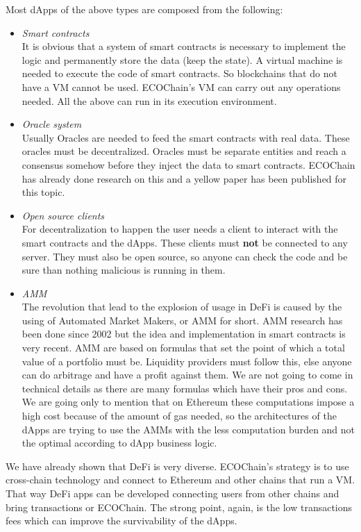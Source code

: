\documentclass{article}
\begin{document}
Most dApps of the above types are composed from the following:
\begin{itemize}
\item \emph{Smart contracts}\\
It is obvious that a system of smart contracts is necessary to implement the logic and permanently store the data (keep the state). A virtual machine is needed to execute the code of smart contracts. So blockchains that do not have a VM cannot be used. ECOChain's VM can carry out any operations needed. All the above can run in its execution environment.
\item \emph{Oracle system}\\
Usually Oracles are needed to feed the smart contracts with real data. These oracles must be decentralized. Oracles must be separate entities and reach a consensus somehow before they inject the data to smart contracts. ECOChain has already done research on this and a yellow paper has been published for this topic.
\item \emph{Open source clients}\\
For decentralization to happen the user needs a client to interact with the smart contracts and the dApps. These clients must \textbf{not} be connected to any server. They must also be open source, so anyone can check the code and be sure than nothing malicious is running in them.
\item \emph{AMM}\\
The revolution that lead to the explosion of usage in DeFi is caused by the using of Automated Market Makers, or AMM for short. AMM research has been done since 2002 but the idea and implementation in smart contracts is very recent. AMM are based on formulas that set the point of which a total value of a portfolio must be. Liquidity providers must follow this, else anyone can do arbitrage and have a profit against them. We are not going to come in technical details as there are many formulas which have their pros and cons. We are going only to mention that on Ethereum these computations impose a high cost because of the amount of gas needed, so the architectures of the dApps are trying to use the AMMs with the less computation burden and not the optimal according to dApp business logic.
\end{itemize}

We have already shown that DeFi is very diverse. ECOChain's strategy is to 
use cross-chain technology and connect to Ethereum and other chains that run a VM. That way DeFi apps can be developed connecting users from other chains and bring transactions or ECOChain. The strong point, again, is the low transactions fees which can improve the survivability of the dApps.
\end{document}
